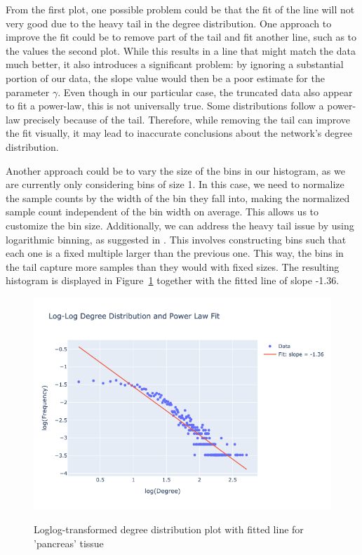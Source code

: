 \documentclass[paper=a4,fontsize=11pt,DIV=8,BCOR=5mm,oneside,pdftex,bibtotocnumbered]{scrreprt}
\theoremstyle{plain}
\begin{document}
	From the first plot, one possible problem could be that the fit of the line will not very good due to the heavy tail in the degree distribution. One approach to improve the fit could be to remove part of the tail and fit another line, such as to the values the second plot. While this results in a line that might match the data much better, it also introduces a significant problem: by ignoring a substantial portion of our data, the slope value would then be a poor estimate for the parameter $\gamma$. Even though in our particular case, the truncated data also appear to fit a power-law, this is not universally true. Some distributions follow a power-law precisely because of the tail. Therefore, while removing the tail can improve the fit visually, it may lead to inaccurate conclusions about the network's degree distribution.
	
	Another approach could be to vary the size of the bins in our histogram, as we are currently only considering bins of size 1. In this case, we need to normalize the sample counts by the width of the bin they fall into, making the normalized sample count independent of the bin width on average. This allows us to customize the bin size. Additionally, we can address the heavy tail issue by using logarithmic binning, as suggested in \cite{Newman2006}. This involves constructing bins such that each one is a fixed multiple larger than the previous one. This way, the bins in the tail capture more samples than they would with fixed sizes. The resulting histogram is displayed in Figure~\ref{fig:hist_log_bins} together with the fitted line of slope -1.36.
	
	\begin{figure}
		\centering
		\caption{Loglog-transformed degree distribution plot with fitted line for 'pancreas' tissue}
		\includegraphics[scale=0.6]{hist_log_binning_fitted_line.png}
		\label{fig:hist_log_bins}
	\end{figure}
	
\end{document}
